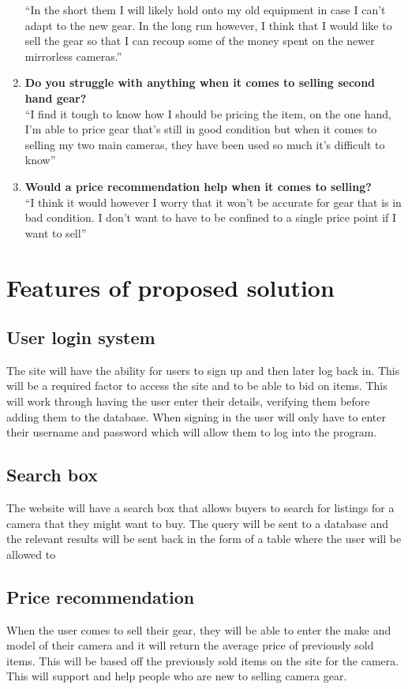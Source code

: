 \begin{enumerate}
“In the short them I will likely hold onto my old equipment in case I can’t adapt to the new gear. In the long run however, I think that I would like to sell the gear so that I can recoup some of the money spent on the newer mirrorless cameras.”
\item \textbf{Do you struggle with anything when it comes to selling second hand gear?} \\
“I find it tough to know how I should be pricing the item, on the one hand, I’m able to price gear that’s still in good condition but when it comes to selling my two main cameras, they have been used so much it’s difficult to know”
\item \textbf{Would a price recommendation help when it comes to selling?} \\
“I think it would however I worry that it won’t be accurate for gear that is in bad condition. I don’t want to have to be confined to a single price point if I want to sell”
\end{enumerate}

\section{Features of proposed solution}
\subsection{User login system}
The site will have the ability for users to sign up and then later log back in. This will be a required factor to access the site and to be able to bid on items. This will work through having the user enter their details, verifying them before adding them to the database. When signing in the user will only have to enter their username and password which will allow them to log into the program.  
\subsection{Search box}
The website will have a search box that allows buyers to search for listings for a camera that they might want to buy. The query will be sent to a database and the relevant results will be sent back in the form of a table where the user will be allowed to
\subsection{Price recommendation}
When the user comes to sell their gear, they will be able to enter the make and model of their camera and it will return the average price of previously sold items. This will be based off the previously sold items on the site for the camera. This will support and help people who are new to selling camera gear.
